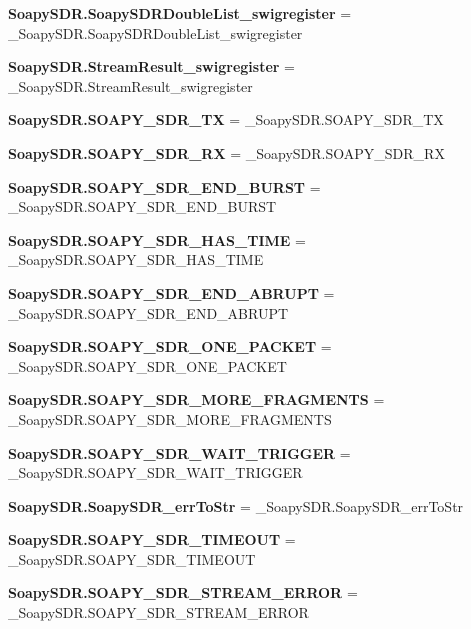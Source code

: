 \begin{DoxyCompactItemize}
\item 
{\bf Soapy\+S\+D\+R.\+Soapy\+S\+D\+R\+Double\+List\+\_\+swigregister} = \+\_\+\+Soapy\+S\+D\+R.\+Soapy\+S\+D\+R\+Double\+List\+\_\+swigregister
\item 
{\bf Soapy\+S\+D\+R.\+Stream\+Result\+\_\+swigregister} = \+\_\+\+Soapy\+S\+D\+R.\+Stream\+Result\+\_\+swigregister
\item 
{\bf Soapy\+S\+D\+R.\+S\+O\+A\+P\+Y\+\_\+\+S\+D\+R\+\_\+\+TX} = \+\_\+\+Soapy\+S\+D\+R.\+S\+O\+A\+P\+Y\+\_\+\+S\+D\+R\+\_\+\+TX
\item 
{\bf Soapy\+S\+D\+R.\+S\+O\+A\+P\+Y\+\_\+\+S\+D\+R\+\_\+\+RX} = \+\_\+\+Soapy\+S\+D\+R.\+S\+O\+A\+P\+Y\+\_\+\+S\+D\+R\+\_\+\+RX
\item 
{\bf Soapy\+S\+D\+R.\+S\+O\+A\+P\+Y\+\_\+\+S\+D\+R\+\_\+\+E\+N\+D\+\_\+\+B\+U\+R\+ST} = \+\_\+\+Soapy\+S\+D\+R.\+S\+O\+A\+P\+Y\+\_\+\+S\+D\+R\+\_\+\+E\+N\+D\+\_\+\+B\+U\+R\+ST
\item 
{\bf Soapy\+S\+D\+R.\+S\+O\+A\+P\+Y\+\_\+\+S\+D\+R\+\_\+\+H\+A\+S\+\_\+\+T\+I\+ME} = \+\_\+\+Soapy\+S\+D\+R.\+S\+O\+A\+P\+Y\+\_\+\+S\+D\+R\+\_\+\+H\+A\+S\+\_\+\+T\+I\+ME
\item 
{\bf Soapy\+S\+D\+R.\+S\+O\+A\+P\+Y\+\_\+\+S\+D\+R\+\_\+\+E\+N\+D\+\_\+\+A\+B\+R\+U\+PT} = \+\_\+\+Soapy\+S\+D\+R.\+S\+O\+A\+P\+Y\+\_\+\+S\+D\+R\+\_\+\+E\+N\+D\+\_\+\+A\+B\+R\+U\+PT
\item 
{\bf Soapy\+S\+D\+R.\+S\+O\+A\+P\+Y\+\_\+\+S\+D\+R\+\_\+\+O\+N\+E\+\_\+\+P\+A\+C\+K\+ET} = \+\_\+\+Soapy\+S\+D\+R.\+S\+O\+A\+P\+Y\+\_\+\+S\+D\+R\+\_\+\+O\+N\+E\+\_\+\+P\+A\+C\+K\+ET
\item 
{\bf Soapy\+S\+D\+R.\+S\+O\+A\+P\+Y\+\_\+\+S\+D\+R\+\_\+\+M\+O\+R\+E\+\_\+\+F\+R\+A\+G\+M\+E\+N\+TS} = \+\_\+\+Soapy\+S\+D\+R.\+S\+O\+A\+P\+Y\+\_\+\+S\+D\+R\+\_\+\+M\+O\+R\+E\+\_\+\+F\+R\+A\+G\+M\+E\+N\+TS
\item 
{\bf Soapy\+S\+D\+R.\+S\+O\+A\+P\+Y\+\_\+\+S\+D\+R\+\_\+\+W\+A\+I\+T\+\_\+\+T\+R\+I\+G\+G\+ER} = \+\_\+\+Soapy\+S\+D\+R.\+S\+O\+A\+P\+Y\+\_\+\+S\+D\+R\+\_\+\+W\+A\+I\+T\+\_\+\+T\+R\+I\+G\+G\+ER
\item 
{\bf Soapy\+S\+D\+R.\+Soapy\+S\+D\+R\+\_\+err\+To\+Str} = \+\_\+\+Soapy\+S\+D\+R.\+Soapy\+S\+D\+R\+\_\+err\+To\+Str
\item 
{\bf Soapy\+S\+D\+R.\+S\+O\+A\+P\+Y\+\_\+\+S\+D\+R\+\_\+\+T\+I\+M\+E\+O\+UT} = \+\_\+\+Soapy\+S\+D\+R.\+S\+O\+A\+P\+Y\+\_\+\+S\+D\+R\+\_\+\+T\+I\+M\+E\+O\+UT
\item 
{\bf Soapy\+S\+D\+R.\+S\+O\+A\+P\+Y\+\_\+\+S\+D\+R\+\_\+\+S\+T\+R\+E\+A\+M\+\_\+\+E\+R\+R\+OR} = \+\_\+\+Soapy\+S\+D\+R.\+S\+O\+A\+P\+Y\+\_\+\+S\+D\+R\+\_\+\+S\+T\+R\+E\+A\+M\+\_\+\+E\+R\+R\+OR

\end{DoxyCompactItemize}
